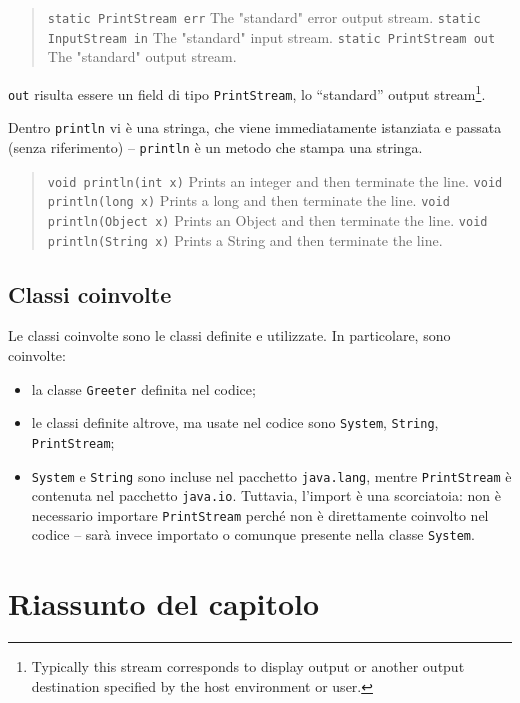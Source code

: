 \documentclass[\fontsizeclass,twocolumn]{\classname}
\theoremstyle{definition}
\theoremstyle{definition}
\begin{document}
\begin{quote}
    \footnotesize{\texttt{static PrintStream 	err} 	The "standard" error output stream.
    \texttt{static InputStream 	in} 	The "standard" input stream.
\texttt{static PrintStream 	out} 	The "standard" output stream.}
\end{quote}

\texttt{out} risulta essere un field di tipo \texttt{PrintStream}, lo
``standard'' output stream\footnote{Typically this stream corresponds to
display output or another output destination specified by the host environment
or user.}.


Dentro \texttt{println} vi è una stringa, che viene immediatamente istanziata e
passata (senza riferimento) \--- \texttt{println} è un metodo che stampa una
stringa.


\begin{quote}
    \footnotesize{\texttt{void 	println(int x)} 	Prints an integer and then terminate the line.
    \texttt{void 	println(long x)} 	Prints a long and then terminate the line.
    \texttt{void 	println(Object x)} 	Prints an Object and then terminate the line.
\texttt{void 	println(String x)} 	Prints a String and then terminate the line.}
\end{quote}

\subsection{Classi coinvolte}

Le classi coinvolte sono le classi definite e utilizzate. In particolare, sono coinvolte:
\begin{itemize}
    \item la classe \texttt{Greeter} definita nel codice;
    \item le classi definite altrove, ma usate nel codice sono \texttt{System},
        \texttt{String}, \texttt{PrintStream};
    \item \texttt{System} e \texttt{String} sono incluse nel pacchetto
        \texttt{java.lang}, mentre \texttt{PrintStream} è contenuta nel
        pacchetto \texttt{java.io}. Tuttavia, l'import è una scorciatoia: non è
        necessario importare \texttt{PrintStream} perché non è direttamente
        coinvolto nel codice \--- sarà invece importato o comunque presente
        nella classe \texttt{System}.
\end{itemize}

\section{Riassunto del capitolo}
\end{document}
